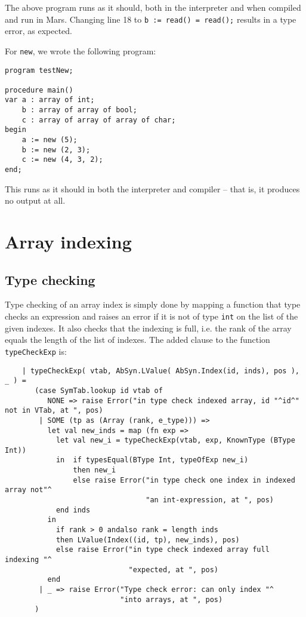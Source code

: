 \documentclass{article}
\begin{document}
The above program runs as it should, both in the interpreter and when compiled and run in Mars. Changing line 18 to \texttt{b := read() = read();} results in a type error, as expected.

For \texttt{new}, we wrote the following program:

\begin{lstlisting}[language=Paladim]
program testNew;

procedure main()
var a : array of int;
    b : array of array of bool;
    c : array of array of array of char;
begin
    a := new (5);
    b := new (2, 3);
    c := new (4, 3, 2);
end;
\end{lstlisting}

This runs as it should in both the interpreter and compiler -- that is, it produces no output at all.

\section{Array indexing}
\subsection{Type checking}
Type checking of an array index is simply done by mapping a function that type checks an expression and raises an error if it is not of type \texttt{int} on the list of the given indexes. It also checks that the indexing is full, i.e. the rank of the array equals the length of the list of indexes.
The added clause to the function \texttt{typeCheckExp} is:
\begin{lstlisting}
    | typeCheckExp( vtab, AbSyn.LValue( AbSyn.Index(id, inds), pos ), _ ) =
       (case SymTab.lookup id vtab of
          NONE => raise Error("in type check indexed array, id "^id^" not in VTab, at ", pos)
        | SOME (tp as (Array (rank, e_type))) =>
          let val new_inds = map (fn exp =>
            let val new_i = typeCheckExp(vtab, exp, KnownType (BType Int))
            in  if typesEqual(BType Int, typeOfExp new_i)
                then new_i
                else raise Error("in type check one index in indexed array not"^
                                 "an int-expression, at ", pos)
            end inds
          in
            if rank > 0 andalso rank = length inds
            then LValue(Index((id, tp), new_inds), pos)
            else raise Error("in type check indexed array full indexing "^
                             "expected, at ", pos)
          end
        | _ => raise Error("Type check error: can only index "^
                           "into arrays, at ", pos)
       )
\end{lstlisting}
\end{document}
